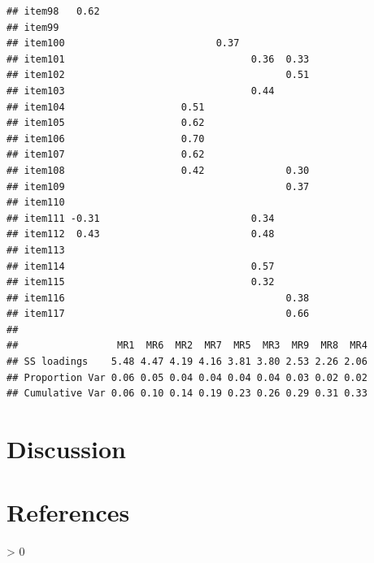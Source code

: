 \documentclass[
  english,
  man]{apa6}
\newlength{\cslhangindent}
\newenvironment{CSLReferences}[2] %
 {%
  \setlength{\parindent}{0pt}
  \ifodd #1 \everypar{\setlength{\hangindent}{\cslhangindent}}\ignorespaces\fi
  \ifnum #2 > 0
  \setlength{\parskip}{#2\baselineskip}
  \fi
 }%
 {}
\begin{document}
\begin{verbatim}
## item98   0.62                                                
## item99                                                       
## item100                          0.37                        
## item101                                0.36  0.33            
## item102                                      0.51            
## item103                                0.44                  
## item104                    0.51                              
## item105                    0.62                              
## item106                    0.70                              
## item107                    0.62                              
## item108                    0.42              0.30            
## item109                                      0.37            
## item110                                                      
## item111 -0.31                          0.34                  
## item112  0.43                          0.48                  
## item113                                                      
## item114                                0.57                  
## item115                                0.32                  
## item116                                      0.38            
## item117                                      0.66            
## 
##                 MR1  MR6  MR2  MR7  MR5  MR3  MR9  MR8  MR4
## SS loadings    5.48 4.47 4.19 4.16 3.81 3.80 2.53 2.26 2.06
## Proportion Var 0.06 0.05 0.04 0.04 0.04 0.04 0.03 0.02 0.02
## Cumulative Var 0.06 0.10 0.14 0.19 0.23 0.26 0.29 0.31 0.33
\end{verbatim}

\hypertarget{discussion}{%
\section{Discussion}\label{discussion}}

\newpage

\hypertarget{references}{%
\section{References}\label{references}}

\begingroup
\setlength{\parindent}{-0.5in}
\setlength{\leftskip}{0.5in}

\hypertarget{refs}{}
\begin{CSLReferences}{0}{0}
\end{CSLReferences}

\endgroup
\end{document}
